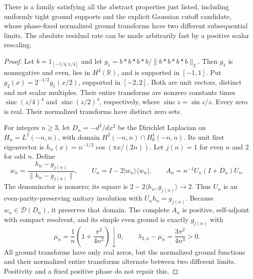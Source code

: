 \begin{proposition}
\label{prop:ns43-ccm-nonselection}
There is a family satisfying all the abstract properties just listed,
including uniformly tight ground supports and the explicit Gaussian
cutoff candidate, whose phase-fixed normalized ground transforms have
two different subsequential limits. The absolute residual rate can be
made arbitrarily fast by a positive scalar rescaling.
\end{proposition}
\begin{proof}
Let $b=1_{[-1/4,1/4]}$ and let $g_1=b*b*b*b/\|b*b*b*b\|_2$.
Then $g_1$ is nonnegative and even, lies in $H^2(\mathbb R)$, and is
supported in $[-1,1]$. Put $g_2(x)=2^{-1/2}g_1(x/2)$, supported in
$[-2,2]$. Both are unit vectors, distinct and not scalar multiples.
Their entire transforms are nonzero constants times
$\operatorname{sinc}(z/4)^4$ and $\operatorname{sinc}(z/2)^4$,
respectively, where $\operatorname{sinc}z=\sin z/z$. Every zero is real.
Their normalized transforms have distinct zero sets.

For integers $n\ge3$, let $D_n=-d^2/dx^2$ be the Dirichlet Laplacian
on $H_n=L^2(-n,n)$, with domain $H^2(-n,n)\cap H_0^1(-n,n)$.
Its unit first eigenvector is
$h_n(x)=n^{-1/2}\cos(\pi x/(2n))$.
Let $j(n)=1$ for even $n$ and $2$ for odd $n$. Define
\[
 w_n=\frac{h_n-g_{j(n)}}{\|h_n-g_{j(n)}\|},\qquad
 U_n=I-2|w_n\rangle\langle w_n|,\qquad
 A_n=n^{-1}U_n(I+D_n)U_n.
\]
The denominator is nonzero; its square is
$2-2\langle h_n,g_{j(n)}\rangle\to2$.
Thus $U_n$ is an even-parity-preserving unitary involution with
$U_nh_n=g_{j(n)}$. Because $w_n\in\mathcal D(D_n)$, it preserves
that domain. The complete $A_n$ is positive, self-adjoint with compact
resolvent, and its simple even ground is exactly $g_{j(n)}$ with
\[
 \mu_n=\frac1n\left(1+\frac{\pi^2}{4n^2}\right)\downarrow0,
 \qquad \lambda_{2,n}-\mu_n=\frac{3\pi^2}{4n^3}>0.
\]
All ground transforms have only real zeros, but the normalized ground
functions and their normalized entire transforms alternate between two
different limits. Positivity and a fixed positive phase do not repair this.


\end{proof}
